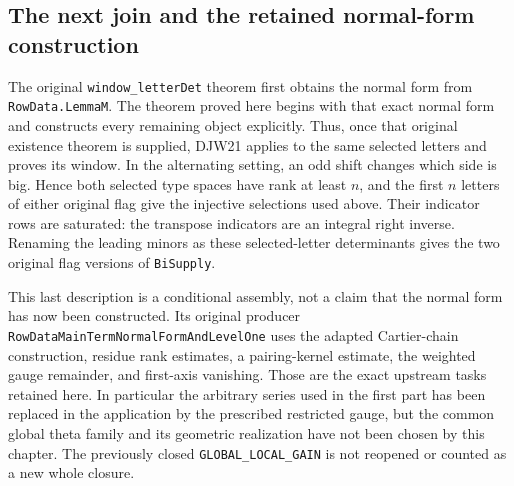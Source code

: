 \documentclass[11pt,a4paper]{article}
\numberwithin{equation}{section}
\theoremstyle{remark}\newtheorem{remark}[theorem]{Remark}
\begin{document}
\subsection{The next join and the retained normal-form construction}

The original \texttt{window\_\allowbreak letter\allowbreak Det} theorem first obtains the
normal form from \texttt{Row\allowbreak Data.\allowbreak Lemma\allowbreak M}.  The theorem proved here
begins with that exact normal form and constructs every remaining
object explicitly.  Thus, once that original existence theorem is
supplied, DJW21 applies to the same selected letters and proves its
window.  In the alternating setting, an odd shift changes which
side is big.  Hence both selected type spaces have rank at least
$n$, and the first $n$ letters of either original flag give the
injective selections used above.  Their indicator rows are saturated:
the transpose indicators are an integral right inverse.  Renaming the
leading minors as these selected-letter determinants gives the two
original flag versions of \texttt{Bi\allowbreak Supply}.

This last description is a conditional assembly, not a claim that
the normal form has now been constructed.  Its original producer
\texttt{Row\allowbreak Data\allowbreak Main\allowbreak Term\allowbreak Normal\allowbreak Form\allowbreak And\allowbreak Level\allowbreak One} uses the adapted
Cartier-chain construction, residue rank estimates, a pairing-kernel
estimate, the weighted gauge remainder, and first-axis vanishing.
Those are the exact upstream tasks retained here.  In particular the
arbitrary series used in the first part has been replaced in the
application by the prescribed restricted gauge, but the common global
theta family and its geometric realization have not been chosen by
this chapter.  The previously closed
\texttt{GLOBAL\_\allowbreak LOCAL\_\allowbreak GAIN} is not reopened or counted as a new
whole closure.
\end{document}
